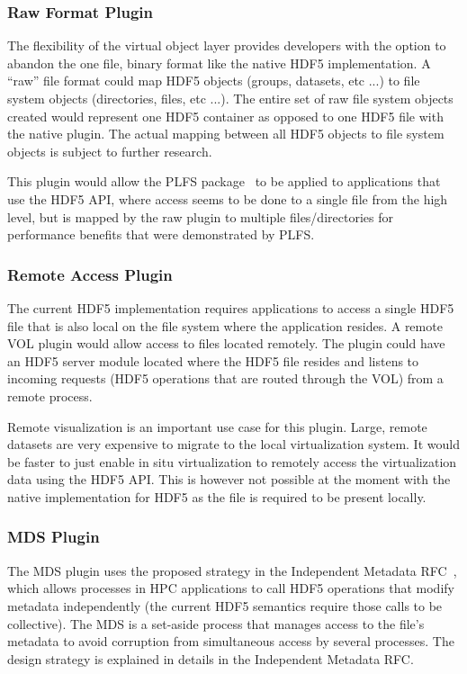 \documentclass[letterpaper,hyper]{THG_RFC}
\begin{document}
\subsubsection{Raw Format Plugin}
The flexibility of the virtual object layer provides developers with the option to abandon the one file, binary format like the native HDF5 implementation. A ``raw'' file format could map HDF5 objects (groups, datasets, etc ...) to file system objects (directories, files, etc ...). The entire set of raw file system objects created would represent one HDF5 container as opposed to one HDF5 file with the native plugin. The actual mapping between all HDF5 objects to file system objects is subject to further research.

This plugin would allow the PLFS package~\cite{plfs} to be applied to applications that use the HDF5 API, where access seems to be done to a single file from the high level, but is mapped by the raw plugin to multiple files/directories for performance benefits that were demonstrated by PLFS.

\subsubsection{Remote Access Plugin}
The current HDF5 implementation requires applications to access a single HDF5 file that is also local on the file system where the application resides. A remote VOL plugin would allow access to files located remotely. The plugin could have an HDF5 server module located where the HDF5 file resides and listens to incoming requests (HDF5 operations that are routed through the VOL) from a remote process. 

Remote visualization is an important use case for this plugin. Large, remote datasets are very expensive to migrate to the local virtualization system. It would be faster to just enable in situ virtualization to remotely access the virtualization data using the HDF5 API. This is however not possible at the moment with the native implementation for HDF5 as the file is required to be present locally.

\subsubsection{MDS Plugin}
The MDS plugin uses the proposed strategy in the Independent Metadata RFC~\cite{mds}, which allows processes in HPC applications to call HDF5 operations that modify metadata independently (the current HDF5 semantics require those calls to be collective). The MDS is a set-aside process that manages access to the file's metadata to avoid corruption from simultaneous access by several processes. The design strategy is explained in details in the Independent Metadata RFC.
\end{document}
